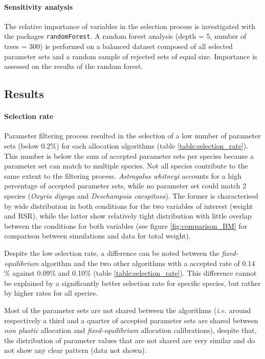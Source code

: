 \paragraph{Sensitivity analysis}
The relative importance of variables in the selection process is investigated with the packages \texttt{randomForest}. A random forest analysis (depth = 5, number of trees = 300) is performed on a balanced dataset composed of all selected parameter sets and a random sample of rejected sets of equal size. Importance is assessed on the results of the random forest.

\subsection{Results}

\paragraph{Selection rate}
Parameter filtering process resulted in the selection of a low number of parameter sets (below 0.2\%) for each allocation algorithms (table \ref{table:selection_rate}). This number is below the sum of accepted parameter sets per species because a parameter set can match to multiple species. Not all species contribute to the same extent to the filtering process. \textit{Astragalus whitneyi} accounts for a high percentage of accepted parameter sets, while no parameter set could match 2 species (\textit{Oxyria dignya} and \textit{Deschampsia caespitosa}). The former is characterised by wide distribution in both conditions for the two variables of interest (weight and RSR), while the latter show relatively tight distribution with little overlap between the conditions for both variables (see figure \ref{fig:comparison_BM} for comparison between simulations and data for total weight).


Despite the low selection rate, a difference can be noted between the \textit{fixed-equilibrium} algorithm and the two other algorithms with a accepted rate of 0.14 \% against 0.09\% and 0.10\% (table \ref{table:selection_rate}). This difference cannot be explained by a significantly better selection rate for specific species, but rather by higher rates for all species.

Most of the parameter sets are not shared between the algorithms (\textit{i.e.} around respectively a third and a quarter of accepted parameter sets are shared between \textit{non plastic} allocation and \textit{fixed-equilibrium} allocation calibrations), despite that, the distribution of parameter values that are not shared are very similar and do not show any clear pattern (data not shown).

